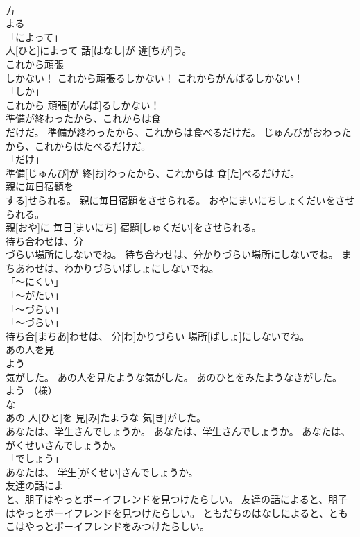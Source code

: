 \documentclass[8pt]{extreport}
\begin{document}
\begin{CJK}{UTF8}{min}
\\	方 
\\	よる 
\\	「によって」 
\\	人[ひと]によって 話[はなし]が 違[ちが]う。		
\\	これから頑張
\\	しかない！	これから頑張るしかない！	これからがんばるしかない！	
\\	「しか」 
\\	これから 頑張[がんば]るしかない！		
\\	準備が終わったから、これからは食
\\	だけだ。	準備が終わったから、これからは食べるだけだ。	じゅんびがおわったから、これからはたべるだけだ。	
\\	「だけ」 
\\	準備[じゅんび]が 終[お]わったから、これからは 食[た]べるだけだ。		
\\	親に毎日宿題を
\\	する]せられる。	親に毎日宿題をさせられる。	おやにまいにちしょくだいをさせられる。	
\\	親[おや]に 毎日[まいにち] 宿題[しゅくだい]をさせられる。		
\\	待ち合わせは、分
\\	づらい場所にしないでね。	待ち合わせは、分かりづらい場所にしないでね。	まちあわせは、わかりづらいばしょにしないでね。	
\\	「～にくい」 
\\	「～がたい」 
\\	「～づらい」 
\\	「～づらい」 
\\	待ち合[まちあ]わせは、 分[わ]かりづらい 場所[ばしょ]にしないでね。		
\\	あの人を見
\\	よう
\\	気がした。	あの人を見たような気がした。	あのひとをみたようなきがした。	
\\	よう （様） 
\\	な 
\\	あの 人[ひと]を 見[み]たような 気[き]がした。		
\\	あなたは、学生さんでしょうか。	あなたは、学生さんでしょうか。	あなたは、がくせいさんでしょうか。	
\\	「でしょう」 
\\	あなたは、 学生[がくせい]さんでしょうか。		
\\	友達の話によ
\\	と、朋子はやっとボーイフレンドを見つけたらしい。	友達の話によると、朋子はやっとボーイフレンドを見つけたらしい。	ともだちのはなしによると、ともこはやっとボーイフレンドをみつけたらしい。	

\end{CJK}
\end{document}
